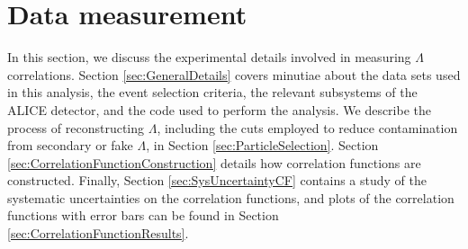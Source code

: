 \chapter{Data measurement}
\label{sec:DataMeasurement}

In this section, we discuss the experimental details involved in measuring $\Lambda$ correlations.
Section \ref{sec:GeneralDetails} covers minutiae about the data sets used in this analysis, the event selection criteria, the relevant subsystems of the ALICE detector, and the code used to perform the analysis.
We describe the process of reconstructing $\Lambda$, including the cuts employed to reduce contamination from secondary or fake $\Lambda$, in Section \ref{sec:ParticleSelection}.
Section \ref{sec:CorrelationFunctionConstruction} details how correlation functions are constructed.
Finally, Section \ref{sec:SysUncertaintyCF} contains a study of the systematic uncertainties on the correlation functions, and plots of the correlation functions with error bars can be found in Section \ref{sec:CorrelationFunctionResults}.





